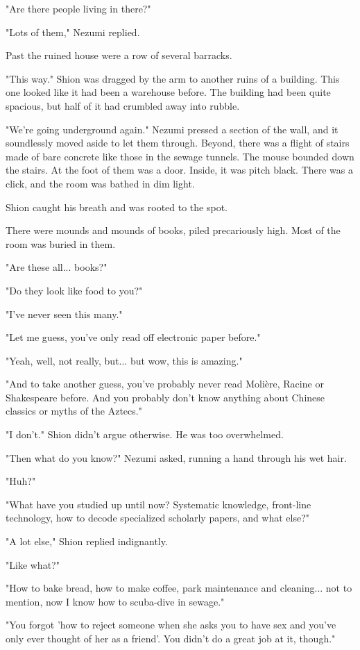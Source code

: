 "Are there people living in there?"

"Lots of them," Nezumi replied.

Past the ruined house were a row of several barracks.

"This way." Shion was dragged by the arm to another ruins of a building.
This one looked like it had been a warehouse before. The building had
been quite spacious, but half of it had crumbled away into rubble.

"We're going underground again." Nezumi pressed a section of the wall,
and it soundlessly moved aside to let them through. Beyond, there was a
flight of stairs made of bare concrete like those in the sewage tunnels.
The mouse bounded down the stairs. At the foot of them was a door.
Inside, it was pitch black. There was a click, and the room was bathed
in dim light.

Shion caught his breath and was rooted to the spot.

There were mounds and mounds of books, piled precariously high. Most of
the room was buried in them.

"Are these all... books?"

"Do they look like food to you?"

"I've never seen this many."

"Let me guess, you've only read off electronic paper before."

"Yeah, well, not really, but... but wow, this is amazing."

"And to take another guess, you've probably never read Molière, Racine
or Shakespeare before. And you probably don't know anything about
Chinese classics or myths of the Aztecs."

"I don't." Shion didn't argue otherwise. He was too overwhelmed.

"Then what do you know?" Nezumi asked, running a hand through his wet
hair.

"Huh?"

"What have you studied up until now? Systematic knowledge, front-line
technology, how to decode specialized scholarly papers, and what else?"

"A lot else," Shion replied indignantly.

"Like what?"

"How to bake bread, how to make coffee, park maintenance and cleaning...
not to mention, now I know how to scuba-dive in sewage."

"You forgot 'how to reject someone when she asks you to have sex and
you've only ever thought of her as a friend'. You didn't do a great job
at it, though."

